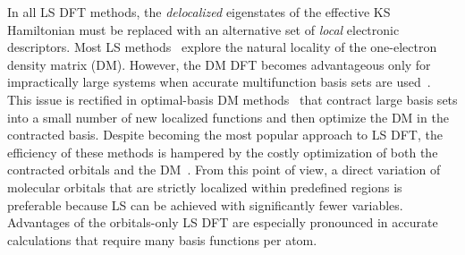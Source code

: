 \documentclass[aps,prl,reprint,amsmath,amssymb]{revtex4-1}
\begin{document}
In all LS DFT methods, the \emph{delocalized} eigenstates of the effective KS Hamiltonian must be replaced with an alternative set of \emph{local} electronic descriptors. 
Most LS methods~\cite{a:ls-rev-1999, a:ls-rev-2012, Kussmann2013, Aarons2016} explore the natural locality of the one-electron density matrix (DM). 
However, the DM DFT becomes advantageous only for impractically large systems when accurate multifunction basis sets are used~\cite{a:ls-dm-sign, Arita2014, a:ls-rev-2012, a:almo-ls}.
This issue is rectified in optimal-basis DM methods~\cite{Skylaris2005, Nakata2015, Mohr2015} that contract large basis sets into a small number of new localized functions and then optimize the DM in the contracted basis. 
Despite becoming the most popular approach to LS DFT, the efficiency of these methods is hampered by the costly optimization of both the contracted orbitals and the DM~\cite{a:ls-onetep-2003}. 
%
From this point of view, a direct variation of molecular orbitals that are strictly localized within predefined regions is preferable because LS can be achieved with significantly fewer variables. 
Advantages of the orbitals-only LS DFT are especially pronounced in accurate calculations that require many basis functions per atom.
%
%
\end{document}
